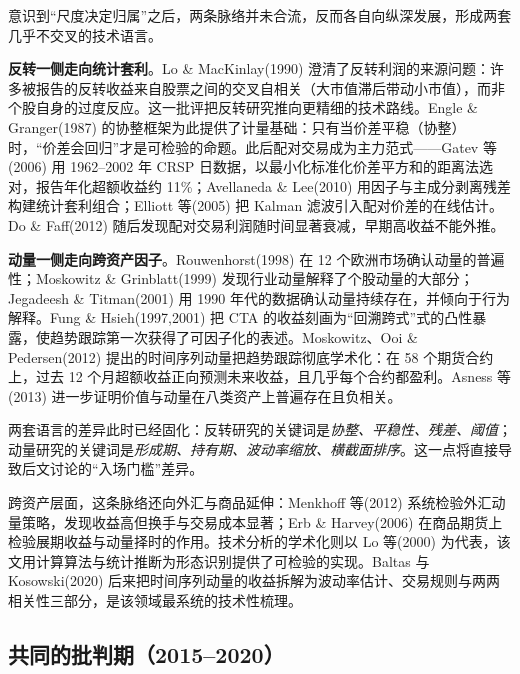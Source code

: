 意识到“尺度决定归属”之后，两条脉络并未合流，反而各自向纵深发展，形成两套几乎不交叉的技术语言。

\textbf{反转一侧走向统计套利}。Lo \& MacKinlay(1990) 澄清了反转利润的来源问题：许多被报告的反转收益来自股票之间的交叉自相关（大市值滞后带动小市值），而非个股自身的过度反应\cite{lomackinlay1990}。这一批评把反转研究推向更精细的技术路线。Engle \& Granger(1987) 的协整框架为此提供了计量基础\cite{englegranger1987}：只有当价差平稳（协整）时，“价差会回归”才是可检验的命题。此后配对交易成为主力范式——Gatev 等(2006) 用 1962--2002 年 CRSP 日数据，以最小化标准化价差平方和的距离法选对，报告年化超额收益约 11\%\cite{gatev2006}；Avellaneda \& Lee(2010) 用因子与主成分剥离残差构建统计套利组合\cite{avellaneda2010}；Elliott 等(2005) 把 Kalman 滤波引入配对价差的在线估计\cite{elliott2005}。Do \& Faff(2012) 随后发现配对交易利润随时间显著衰减，早期高收益不能外推\cite{dofaff2012}。

\textbf{动量一侧走向跨资产因子}。Rouwenhorst(1998) 在 12 个欧洲市场确认动量的普遍性\cite{rouwenhorst1998}；Moskowitz \& Grinblatt(1999) 发现行业动量解释了个股动量的大部分\cite{moskowitzgrinblatt1999}；Jegadeesh \& Titman(2001) 用 1990 年代的数据确认动量持续存在，并倾向于行为解释\cite{jegadeesh2001}。Fung \& Hsieh(1997,2001) 把 CTA 的收益刻画为“回溯跨式”式的凸性暴露，使趋势跟踪第一次获得了可因子化的表述\cite{funghsieh1997,funghsieh2001}。Moskowitz、Ooi \& Pedersen(2012) 提出的时间序列动量把趋势跟踪彻底学术化：在 58 个期货合约上，过去 12 个月超额收益正向预测未来收益，且几乎每个合约都盈利\cite{mop2012}。Asness 等(2013) 进一步证明价值与动量在八类资产上普遍存在且负相关\cite{asness2013}。

两套语言的差异此时已经固化：反转研究的关键词是\emph{协整、平稳性、残差、阈值}；动量研究的关键词是\emph{形成期、持有期、波动率缩放、横截面排序}。这一点将直接导致后文讨论的“入场门槛”差异。

跨资产层面，这条脉络还向外汇与商品延伸：Menkhoff 等(2012) 系统检验外汇动量策略，发现收益高但换手与交易成本显著\cite{menkhoff2012}；Erb \& Harvey(2006) 在商品期货上检验展期收益与动量择时的作用\cite{erbharvey2006}。技术分析的学术化则以 Lo 等(2000) 为代表，该文用计算算法与统计推断为形态识别提供了可检验的实现\cite{lo2000}。Baltas 与 Kosowski(2020) 后来把时间序列动量的收益拆解为波动率估计、交易规则与两两相关性三部分，是该领域最系统的技术性梳理\cite{baltaskosowski2020}。

\subsection{共同的批判期（2015--2020）}

